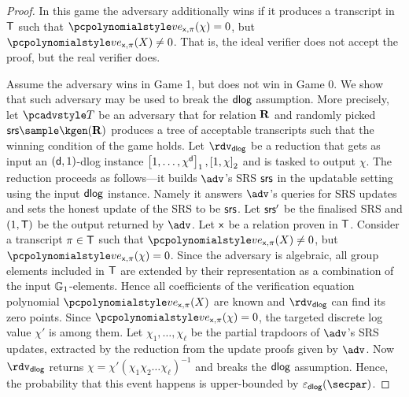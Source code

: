 \begin{proof}
	 In this game the adversary additionally wins if it produces a
	transcript in $\mathsf{T}$ such that $\vereq_{\inp, \zkproof}(\chi) = 0$, but
	$\vereq_{\inp, \zkproof}(X) \neq 0$. That is, the ideal verifier does not
	accept the proof, but the real verifier does.
	
	 Assume the adversary wins in Game 1, but
	does not win in Game 0. We show that such adversary may be used to break the
	$\mathsf{dlog}$ assumption. More precisely, let $\tdv$ be an adversary that for
	relation $\mathbf{R}$ and randomly picked $\srs \sample \kgen(\REL)$ produces a tree
	of acceptable transcripts such that the winning condition of the game
	holds. Let $\rdvdlog$ be a reduction that gets as input an
	$(\mathsf{d}, 1)$-dlog instance $\left[1, \ldots, \chi^{\mathsf{d}}\right]_{1}, \left[1, \chi\right]_{2}$ and
	is tasked to output $\chi$. The reduction proceeds as follows---it builds $\adv$'s SRS $\mathsf{srs}$ in the updatable setting using the input $\mathsf{dlog}$ instance. Namely it answers $\adv$'s queries for SRS updates and sets the honest update of the SRS to be $\mathsf{srs}$. Let $\mathsf{srs}'$ be the finalised SRS and $(1, \mathsf{T})$ be the output
	returned by $\adv$. Let $\mathsf{x}$ be a relation proven in $\mathsf{T}$.  Consider a
	transcript $\pi \in \mathsf{T}$ such that $\vereq_{\inp, \zkproof}(X) \neq 0$,
	but $\vereq_{\inp, \zkproof}(\chi) = 0$. Since the adversary is algebraic, all
	group elements included in $\mathsf{T}$ are extended by their representation as a
	combination of the input $\mathbb{G}_1$-elements. Hence all coefficients of the
	verification equation polynomial $\vereq_{\inp, \zkproof}(X)$ are known and
	$\rdvdlog$ can find its zero points. Since
	$\vereq_{\inp, \zkproof}(\chi) = 0$, the targeted discrete log value $\chi'$ is
	among them.  Let $\chi_1, \ldots, \chi_\ell$ be the partial trapdoors of $\adv$'s SRS updates,  extracted by the reduction from the update proofs given by $\adv$. Now $\rdvdlog$ returns $\chi = \chi' (\chi_1 \chi_2 \ldots \chi_\ell)^{-1}$ and breaks the $\mathsf{dlog}$ assumption. Hence, the probability that this event happens is upper-bounded
	by $\epsdlog(\secpar)$.
	
\end{proof}

